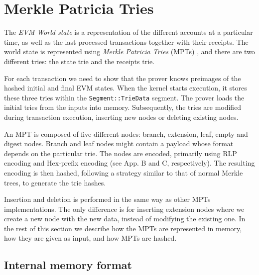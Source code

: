 \section{Merkle Patricia Tries}
\label{tries}
The \emph{EVM World state} is a representation of the different accounts at a particular time, as well as the last processed transactions together with their receipts. The world state is represented using \emph{Merkle Patricia Tries} (MPTs) \cite[App.~D]{yellowpaper}, and there are two different tries: the state trie and the receipts trie.

For each transaction we need to show that the prover knows preimages of the hashed initial and final EVM states.  When the kernel starts execution, it stores these three tries within the {\tt Segment::TrieData} segment. The prover loads the initial tries from the inputs into memory. Subsequently, the tries are modified during transaction execution, inserting new nodes or deleting existing nodes. 

An MPT is composed of five different nodes: branch, extension, leaf, empty and digest nodes. Branch and leaf nodes might contain a payload whose format depends on the particular trie. The nodes are encoded, primarily using RLP encoding and Hex-prefix encoding (see \cite{yellowpaper} App. B and C, respectively). The resulting encoding is then hashed, following a strategy similar to that of normal Merkle trees, to generate the trie hashes.

Insertion and deletion is performed in the same way as other MPTs implementations. The only difference is for inserting extension nodes where we create a new node with the new data, instead of modifying the existing one. In the rest of this section we describe how the MPTs are represented in memory, how they are given as input, and how MPTs are hashed.

\subsection{Internal memory format}

